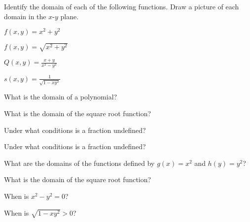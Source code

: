 \begin{activity} \label{A:9.1.1}  Identify the domain of each of the following functions. Draw a picture of each domain in the $x$-$y$ plane.
    \ba
    \item $f(x,y) = x^2+y^2$

    \item $f(x,y) = \sqrt{x^2+y^2}$

    \item $Q(x,y) = \frac{x+y}{x^2-y^2}$

    \item $s(x,y) = \frac{1}{\sqrt{1-xy^2}}$

    \ea
\end{activity}

\begin{smallhint}
\ba
\item What is the domain of a polynomial?
\item What is the domain of the square root function?
\item Under what conditions is a fraction undefined?
\item Under what conditions is a fraction undefined?
\ea
\end{smallhint}

\begin{bighint}
\ba
\item What are the domains of the functions defined by $g(x)=x^2$ and $h(y)=y^2$? 
\item What is the domain of the square root function?
\item When is $x^2-y^2=0$? 
\item When is $\sqrt{1-xy^2} > 0$?
\ea
\end{bighint}

